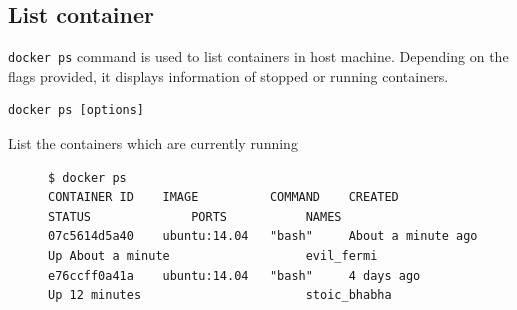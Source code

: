 \documentclass[11pt]{article}
\begin{document}
\subsection{List container}
\label{sec:orgheadline12}
\texttt{docker ps} command is used to list containers in host machine. Depending on
the flags provided, it displays information of stopped or running containers.  
\begin{verbatim}
docker ps [options]
\end{verbatim}

\begin{description}
\item[{List the containers which are currently running}] \begin{verbatim}
$ docker ps
CONTAINER ID    IMAGE          COMMAND    CREATED              STATUS              PORTS           NAMES
07c5614d5a40    ubuntu:14.04   "bash"     About a minute ago   Up About a minute                   evil_fermi
e76ccff0a41a    ubuntu:14.04   "bash"     4 days ago           Up 12 minutes                       stoic_bhabha
\end{verbatim}


\end{description}
\end{document}
